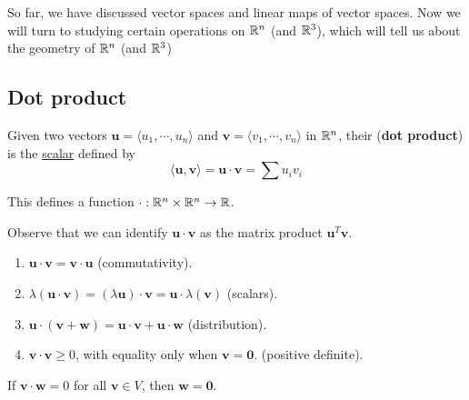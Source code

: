 So far, we have discussed vector spaces and linear maps of vector spaces. Now we will turn to studying certain operations on $\mathbb{R}^n$ (and $\mathbb{R}^3$), which will tell us about the geometry of $\mathbb{R}^n$ (and $\mathbb{R}^3$)

\subsection{Dot product}

\begin{definition}
    Given two vectors $\bm{u} = \langle u_1, \cdots, u_n \rangle$ and $\bm{v}  = \langle v_1 , \cdots, v_n \rangle$ in $\mathbb{R}^n$, their (\textbf{dot product}) is the \underline{scalar} defined by $$\langle \bm{u}, \bm{v}\rangle = \bm{u} \cdot \bm{v} = \sum u_iv_i$$
    
    This defines a function $\cdot: \mathbb{R}^n \times \mathbb{R}^n \to \mathbb{R}$.
    
    \end{definition}


\begin{remark}
Observe that we can identify $\bm{u} \cdot \bm{v}$ as the matrix product $\bm{u}^{T} \bm{v}$.
\end{remark}



\begin{theorem}
    
    \begin{enumerate}
        \item $\bm{u} \cdot \bm{v} = \bm{v} \cdot \bm{u}$ (commutativity).
        \item $\lambda(\bm{u} \cdot \bm{v}) = (\lambda\bm{u}) \cdot \bm{v} = \bm{u} \cdot \lambda(\bm{v})$ (scalars).
        \item $\bm{u} \cdot (\bm{v} + \bm{w}) = \bm{u} \cdot \bm{v} + \bm{u} \cdot \bm{w}$ (distribution).
        \item $\bm{v} \cdot \bm{v} \geq 0$, with equality only when $\bm{v} = \bm{0}$. (positive definite).  
    \end{enumerate}
    
    \end{theorem}




    \begin{proposition}\label{dotproduniqueness}
    If $\bm{v} \cdot \bm{w} = 0$ for all $\bm{v} \in V$, then $\bm{w} = \bm{0}$.
    \end{proposition}
    
